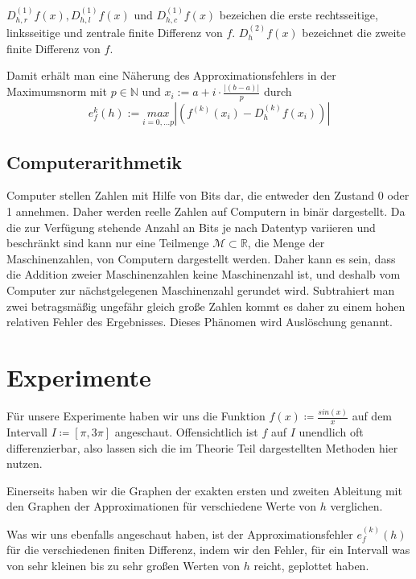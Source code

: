 \documentclass{scrartcl}
\theoremstyle{remark}
\begin{document}
\(D_{h, r}^{(1)}f(x), D_{h, l}^{(1)}f(x) \text{ und } D_{h, c}^{(1)}f(x)\) bezeichen die erste rechtsseitige, linksseitige und zentrale finite Differenz von \(f\).
\(D_{h}^{(2)}f(x)\) bezeichnet die zweite finite Differenz von \(f\).

Damit erhält man eine Näherung des Approximationsfehlers in der Maximumsnorm mit \(p \in \mathbb{N} \text{ und } x_{i} := a + i\cdot\frac{|(b - a)|}{p}\) durch
\[e_{f}^{k}(h) := \underset{i = 0, \dots p}{max}|(f^{(k)}(x_{i}) - D_{h}^{(k)}f(x_{i}))|\] %

\subsection{Computerarithmetik}


Computer stellen Zahlen mit Hilfe von Bits dar, die entweder den Zustand 0 oder 1 annehmen. Daher werden reelle Zahlen auf Computern in binär dargestellt.
Da die zur Verfügung stehende Anzahl an Bits je nach Datentyp variieren und beschränkt sind kann nur eine Teilmenge \(\mathcal{M} \subset \mathbb{R}\), die Menge der Maschinenzahlen,
von Computern dargestellt werden. Daher kann es sein, dass die Addition zweier Maschinenzahlen keine Maschinenzahl ist, und deshalb vom Computer zur nächstgelegenen 
Maschinenzahl gerundet wird. Subtrahiert man zwei betragsmäßig ungefähr gleich große Zahlen kommt es daher zu einem hohen relativen Fehler des Ergebnisses. Dieses Phänomen wird
Auslöschung genannt.

\section{Experimente}
Für unsere Experimente haben wir uns die Funktion \(f(x) \coloneq \frac{sin(x)}{x}\) auf dem Intervall \(I \coloneq [\pi, 3\pi]\) angeschaut. Offensichtlich ist \(f\) auf \(I\) unendlich oft differenzierbar, also
lassen sich die im Theorie Teil dargestellten Methoden hier nutzen.

Einerseits haben wir die Graphen der exakten ersten und zweiten Ableitung mit den Graphen der Approximationen für verschiedene Werte von \(h\) verglichen.


Was wir uns ebenfalls angeschaut haben, ist der Approximationsfehler \(e_{f}^{(k)}(h)\) für die verschiedenen finiten Differenz, indem wir den Fehler, für ein Intervall
was von sehr kleinen bis zu sehr großen Werten von \(h\) reicht, geplottet haben.
\end{document}
